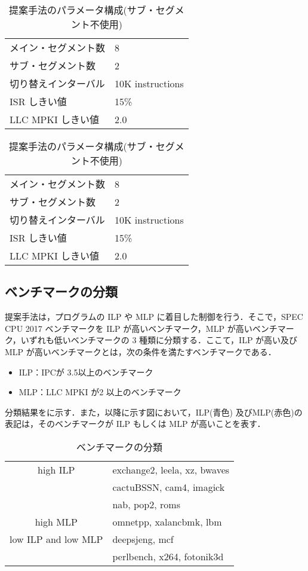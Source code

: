 \begin{table}[tb]
  \caption{提案手法のパラメータ構成(サブ・セグメント使用)}
  \footnotesize
  \center
    \begin{tabular}{l|l} \hline \hline
    メイン・セグメント数 & 8 \\
    サブ・セグメント数 & 2 \\
    切り替えインターバル & 10K instructions \\
    ISR しきい値 & 15\% \\
    LLC MPKI しきい値 & 2.0 \\ \hline 
  \end{tabular}
  \label{tab:subseg_config}
  \caption{提案手法のパラメータ構成(サブ・セグメント不使用)}
  \footnotesize
  \center
    \begin{tabular}{l|l} \hline \hline
    メイン・セグメント数 & 8 \\
    サブ・セグメント数 & 2 \\
    切り替えインターバル & 10K instructions \\
    ISR しきい値 & 15\% \\
    LLC MPKI しきい値 & 2.0 \\ \hline 
  \end{tabular}
  \label{tab:non_subseg_config}
\end{table}

\subsection{ベンチマークの分類}
提案手法は，プログラムの ILP や MLP に着目した制御を行う．そこで，SPEC CPU 2017 ベンチマークを ILP が高いベンチマーク，MLP が高いベンチマーク，いずれも低いベンチマークの 3 種類に分類する．ここて，ILP が高い及びMLP が高いベンチマークとは，次の条件を満たすベンチマークである．
\begin{itemize}
  \item ILP：IPCが 3.5以上のベンチマーク
  \item MLP：LLC MPKI が2 以上のベンチマーク
\end{itemize}

分類結果をに示す．また，以降に示す図において，ILP(青色) 及びMLP(赤色)の表記は，そのベンチマークが ILP もしくは MLP が高いことを表す．
\begin{table}[htb]
  \caption{ベンチマークの分類}
  \footnotesize
  \center
    \begin{tabular}{c|l} \hline \hline
    high ILP & exchange2, leela, xz, bwaves\\
             & cactuBSSN, cam4, imagick\\
             & nab, pop2, roms\\ \hline
    high MLP &  omnetpp, xalancbmk, lbm\\ \hline
    low ILP and low MLP & deepsjeng, mcf\\
                        & perlbench, x264, fotonik3d\\ \hline
  \end{tabular}
  \label{tab:classification}
\end{table}


